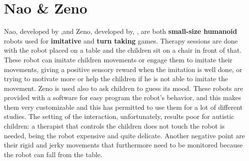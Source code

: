 \section{Nao \& Zeno}
Nao, developed by ,and Zeno, developed by, , are both \textbf{small-size humanoid} robots used for \textbf{imitative} and \textbf{turn taking} games. Therapy sessions are done with the robot placed on a table and the children sit on a chair in front of that. These robot can imitate children movements or engage them to imitate their movements, giving a positive sensory reward when the imitation is well done, or trying to motivate more or help the children if he is not able to imitate the movement. Zeno is used also to ask children to guess its mood. These robots are provided with a software for easy program the robot's behavior, and this makes them very customizable and this has permitted to use them for a lot of different studies. The setting of the interaction, unfortunately, results poor for autistic children: a therapist that controls the children does not touch the robot is needed, being the robot expensive and quite delicate. Another negative point are their rigid and jerky movements that furthermore need to be monitored because the robot can fall from the table. 
